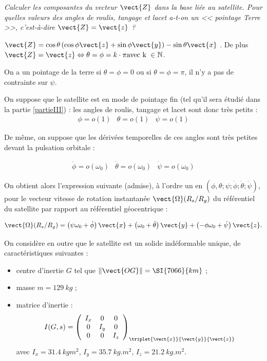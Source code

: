 \fi

\question{\label{q_6}}\textit{Calculer les composantes du vecteur $\vect{Z}$ dans la base  liée au satellite. Pour quelles valeurs des angles de roulis, tangage et lacet a-t-on un << pointage Terre >>, c'est-à-dire $\vect{Z}=\vect{z}$ ?}
\ifprof
\begin{corrige}
$\vect{Z}=\cos\theta\left(\cos\phi\vect{z}+\sin\phi\vect{y}\right)-\sin\theta\vect{x}$ .
De plus $\vect{Z}=\vect{z}\Leftrightarrow \theta=\phi=k\cdot \pi \text{avec k } \in \mathbb{N}$.

On a un pointage de la terre si $\theta=\phi=0$ ou si $\theta=\phi=\pi$, il n'y a pas de contrainte sur $\psi$.
\end{corrige}
\else
\fi

\ifprof
\else
On suppose que le satellite est en mode de pointage fin (tel qu'il sera
étudié dans la partie \ref{partieIII}) : les angles de roulis, tangage et
lacet sont donc très petits :
$$
\begin{array}{ccc}
\phi=o(1) &  \theta=o(1) & \psi=o(1)
\end{array}
$$

De même, on suppose que les dérivées temporelles de ces angles sont très
petites devant la pulsation orbitale :

$$
\begin{array}{ccc}
\dot{\phi}=o(\omega_0) & \dot{\theta}=o(\omega_0) & \dot{\psi}=o(\omega_0)
\end{array}
$$

On obtient alors l'expression suivante (admise), à l'ordre un en $\left(\phi,\theta;\psi;\dot{\phi};\dot{\theta};\dot{\psi}\right)$, pour
le vecteur vitesse de rotation instantanée $\vect{\Omega}(R_s/R_g)$ du référentiel du satellite
par rapport au référentiel géocentrique :

$$
\vect{\Omega}(R_s/R_g)=\left(\psi\omega_0+\dot{\phi}\right)\vect{x}+\left(\omega_0+\dot{\theta}\right)\vect{y}+\left(-\phi\omega_0+\dot{\psi}\right)\vect{z}.
$$

On considère en outre que le satellite est un solide indéformable
unique, de caractéristiques suivantes :

\begin{itemize}
\item  centre d'inertie $G$ tel que $\Vert \vect{OG} \Vert= \SI{7066}{km}$ ;
\item masse $m = \SI{129}{kg}$ ;
\item matrice d'inertie :
$$
I(G,s)=
\left(
\begin{array}{ccc}
I_x & 0 & 0 \\ 
0 & I_y & 0 \\ 
0 & 0 & I_z
\end{array}
\right)_{\triplet{\vect{x}}{\vect{y}}{\vect{z}}} 
$$
 avec $I_{x}= \SI{31,4}{kg m^2}$, $I_{y} = \SI{35,7}{kg.m^2}$, $I_{z} = \SI{21,2}{kg.m^2}$.
\end{itemize}

